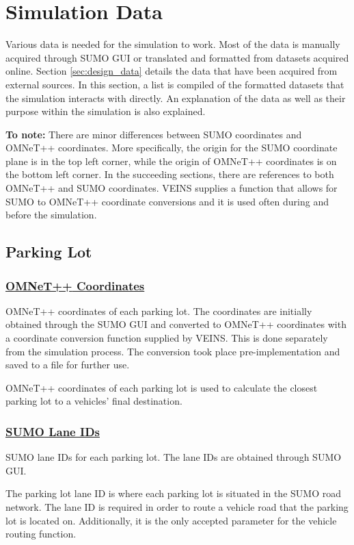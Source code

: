 \section{Simulation Data}
Various data is needed for the simulation to work. Most of the data is manually acquired through \ac{SUMO} GUI or translated and formatted from datasets acquired online. Section \ref{sec:design_data} details the data that have been acquired from external sources. In this section, a list is compiled of the formatted datasets that the simulation interacts with directly. An explanation of the data as well as their purpose within the simulation is also explained.

\textbf{To note:} There are minor differences between \ac{SUMO} coordinates and \ac{OMNeT++} coordinates. More specifically, the origin for the \ac{SUMO} coordinate plane is in the top left corner, while the origin of \ac{OMNeT++} coordinates is on the bottom left corner. In the succeeding sections, there are references to both \ac{OMNeT++} and \ac{SUMO} coordinates. \ac{VEINS} supplies a function that allows for \ac{SUMO} to \ac{OMNeT++} coordinate conversions and it is used often during and before the simulation.

\subsection{Parking Lot}
\subsubsection{\underline{\ac{OMNeT++} Coordinates}}
\begin{description}[leftmargin=8em,style=nextline]
  \item[Explanation] \ac{OMNeT++} coordinates of each parking lot. The coordinates are initially obtained through the \ac{SUMO} GUI and converted to \ac{OMNeT++} coordinates with a coordinate conversion function supplied by \ac{VEINS}. This is done separately from the simulation process. The conversion took place pre-implementation and saved to a file for further use.
  \item[Purpose] \ac{OMNeT++} coordinates of each parking lot is used to calculate the closest parking lot to a vehicles' final destination.
\end{description}

\subsubsection{\underline{\ac{SUMO} Lane IDs}}
\begin{description}[leftmargin=8em,style=nextline]
  \item[Explanation] \ac{SUMO} lane IDs for each parking lot. The lane IDs are obtained through \ac{SUMO} GUI.
  \item[Purpose] The parking lot lane ID is where each parking lot is situated in the \ac{SUMO} road network. The lane ID is required in order to route a vehicle road that the parking lot is located on. Additionally, it is the only accepted parameter for the vehicle routing function.
\end{description}

